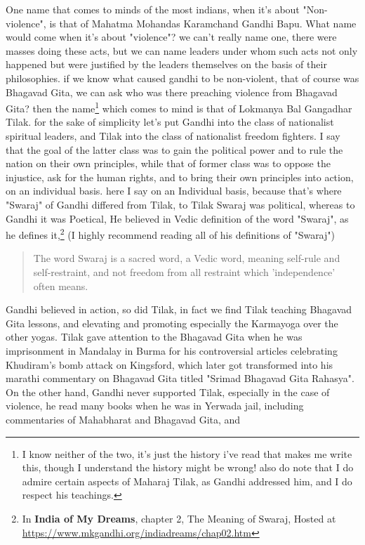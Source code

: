 \documentclass[a4paper]{article}
\begin{document}
One name that comes to minds of the most indians, when it's about "Non-violence", is that of Mahatma Mohandas Karamchand Gandhi Bapu. What name would come 
when it's about "violence"? we can't really name one, there were masses doing these acts, but we can name leaders under whom such
acts not only happened but were justified by the leaders themselves on the basis of their philosophies. if we know what caused
gandhi to be non-violent, that of course was Bhagavad Gita, we can ask who was there preaching violence from Bhagavad Gita? then the
name\footnote{I know neither of the two, it's just the history i've read that makes 
me write this, though I understand the history might be wrong! also do note that I do admire certain aspects of Maharaj Tilak, as Gandhi addressed him, 
and I do respect his teachings.} which comes to mind is that of Lokmanya Bal Gangadhar Tilak. for the sake of simplicity let's put Gandhi into the class of 
nationalist spiritual leaders, and Tilak into the class of nationalist freedom fighters. I say that the goal of the latter
class was to gain the political power and to rule the nation on their own principles, while that of former class was to oppose the 
injustice, ask for the human rights, and to bring their own principles into action, on an individual basis.
here I say on an Individual basis, because that's where "Swaraj" of Gandhi differed from Tilak, to Tilak Swaraj 
was political, whereas to Gandhi it was Poetical, He believed in Vedic definition of the word 
"Swaraj", as he defines it,\footnote{
  In \textbf{India of My Dreams}, chapter 2, The Meaning of Swaraj, 
  Hosted at \href{https://www.mkgandhi.org/indiadreams/chap02.htm}{https://www.mkgandhi.org/indiadreams/chap02.htm}
}
(I highly recommend reading all of his definitions of "Swaraj")
\begin{quote}
    The word Swaraj is a sacred word, a Vedic word, meaning self-rule and self-restraint, and not freedom from all restraint which 'independence' often means.
\end{quote}
Gandhi believed in action, so did Tilak, in fact we find Tilak teaching Bhagavad Gita lessons, and elevating and promoting 
especially the Karmayoga over the other yogas. Tilak gave attention to the Bhagavad Gita when he was imprisonment in 
Mandalay in Burma for his controversial articles celebrating Khudiram’s bomb attack on Kingsford, which later got transformed into
his marathi commentary on Bhagavad Gita titled "Srimad Bhagavad Gita Rahasya". On the other hand, Gandhi never supported Tilak, especially in the
case of violence, he read many books when he was in Yerwada jail, including commentaries of Mahabharat and Bhagavad Gita, and 
\end{document}

